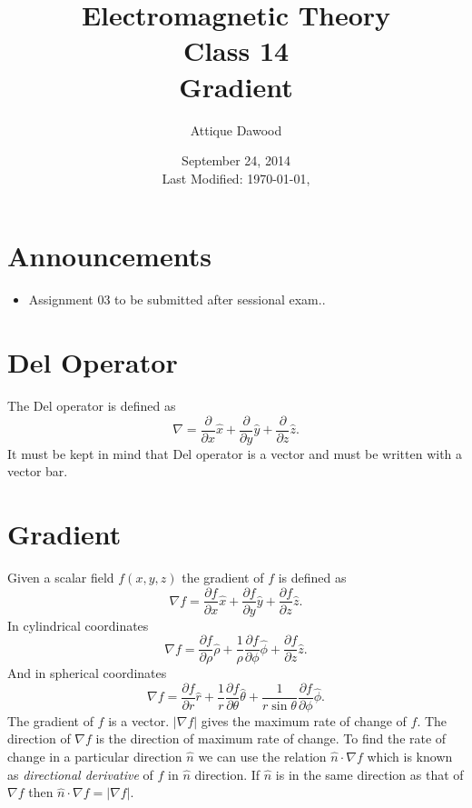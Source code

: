 \documentclass[12pt,a4paper]{article}
\title{Electromagnetic Theory\\Class 14\\Gradient}
\author{Attique Dawood}
\date{September 24, 2014\\[0.2cm] Last Modified: \today, \currenttime}
\begin{document}
\maketitle
\section{Announcements}
\begin{itemize}
\item Assignment 03 to be submitted after sessional exam..
\end{itemize}
\section{Del Operator}
The Del operator is defined as
\begin{equation}
\nabla=\dfrac{\partial}{\partial x}\hat x+\dfrac{\partial}{\partial y}\hat y+\dfrac{\partial}{\partial z}\hat z.
\end{equation}
It must be kept in mind that Del operator is a vector and must be written with a vector bar.
\section{Gradient}
Given a scalar field $f(x,y,z)$ the gradient of $f$ is defined as
\begin{equation}
\nabla f=\dfrac{\partial f}{\partial x}\hat x+\dfrac{\partial f}{\partial y}\hat y+\dfrac{\partial f}{\partial z}\hat z.
\end{equation}
In cylindrical coordinates
\begin{equation}
\nabla f=\dfrac{\partial f}{\partial\rho}\hat\rho+\dfrac{1}{\rho}\dfrac{\partial f}{\partial\phi}\hat\phi+\dfrac{\partial f}{\partial z}\hat z.
\end{equation}
And in spherical coordinates
\begin{equation}
\nabla f=\dfrac{\partial f}{\partial r}\hat r+\dfrac{1}{r}\dfrac{\partial f}{\partial\theta}\hat\theta+\dfrac{1}{r\sin\theta}\dfrac{\partial f}{\partial\phi}\hat\phi.
\end{equation}
The gradient of $f$ is a vector. $|\nabla f|$ gives the maximum rate of change of $f$. The direction of $\nabla f$ is the direction of maximum rate of change. To find the rate of change in a particular direction $\hat n$ we can use the relation $\hat n\cdot\nabla f$ which is known as \textit{directional derivative} of $f$ in $\hat n$ direction. If $\hat n$ is in the same direction as that of $\nabla f$ then $\hat n\cdot\nabla f=|\nabla f|$.
\end{document}
